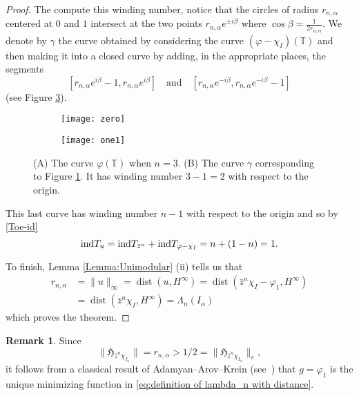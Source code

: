 \documentclass[11pt,reqno]{amsart}
\numberwithin{equation}{section}
\theoremstyle{plain}
\theoremstyle{definition}
\newtheorem{Remark}[equation]{Remark}
\begin{document}
\begin{proof}
The compute this winding number, notice that the circles of radius $r_{n,\alpha}$ centered at $0$ and $1$ intersect at the two points $r_{n,\alpha}e^{\pm i\beta}$ where 
$\cos\beta=\frac{1}{2r_{n,\alpha}}$. We denote by $\gamma$ the curve obtained by considering the curve $({\varphi}-\chi_I)({\mathbb{T}})$ and then making it into a closed curve by adding, in the appropriate places, the segments 
$$[r_{n,\alpha} e^{i\beta}-1, r_{n,\alpha} e^{i\beta}]  \quad \mbox{and} \quad [r_{n,\alpha} e^{-i\beta}, r_{n,\alpha}e^{-i\beta}-1] $$ (see Figure \ref{winding12}).
 
 
 
 
 
  
  
  
  
\begin{figure}
\centering
\begin{subfigure}{.52\textwidth}
  \centering
  \texttt{[image: zero]}
  \caption{}
  \label{winding1}
\end{subfigure}\begin{subfigure}{.52\textwidth}
  \centering
  \texttt{[image: one1]}
  \caption{}
  \label{winding2}
\end{subfigure}
\caption{{\footnotesize (A) The curve ${\varphi}({\mathbb{T}})$ when $n=3$. (B) The curve $\gamma$ corresponding to Figure \ref{winding1}. It has winding number $3 - 1 = 2$ with respect to the origin.}}
\label{winding12}
\end{figure}

This last curve has winding number $n-1$ with respect to the origin and so by \eqref{Toe-id}
\[
{\mathop{\rm ind}} T_u={\mathop{\rm ind}} T_{\bar z^{n}}+{\mathop{\rm ind}} T_{{\varphi} - \chi_{I}}  = n + (1 - n) =1.
\]

To finish, Lemma \ref{Lemma:Unimodular} (ii) tells us that 
\[
\begin{split}
 r_{n,\alpha}&=\|u\|_\infty={\operatorname{dist}}(u, H^\infty)={\operatorname{dist}}(\bar z^n\chi_{I}-{\varphi}_1, H^\infty)\\&={\operatorname{dist}}(\bar z^n\chi_{I}, H^\infty)=
\Lambda_n(I_{\alpha})
\end{split}
\]
which proves the theorem.
\end{proof}

\begin{Remark}
Since 
\[\|{\mathfrak{H}}_{\bar z^n \chi_{I_{\alpha}}} \| =r_{n,\alpha}>1/2= \|{\mathfrak{H}}_{\bar z^n \chi_{I_{\alpha}}} \|_e,
\]
it follows from a classical result of Adamyan--Arov--Krein (see~\cite[Theorem 1.1.4]{Peller}) that $g={\varphi}_1$
is the unique minimizing function in \eqref{eq:definition of lambda_n with distance}. 

\end{Remark}
\end{document}
